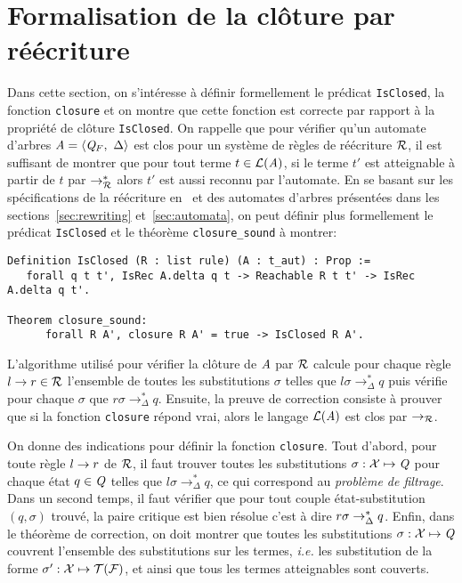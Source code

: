 
\section{Formalisation de la clôture par réécriture}
\label{sec:closure}

Dans cette section, on s'intéresse à définir formellement le prédicat \lstinline!IsClosed!, la fonction 
\lstinline!closure! et on montre que cette fonction est correcte par rapport à la propriété de clôture
\lstinline!IsClosed!. On rappelle que pour vérifier qu'un automate d'arbres $\mathit A = \langle \mathit Q_F,\ \Delta \rangle$ est
clos pour un système de règles de réécriture $\mathcal R$, il est suffisant de montrer que pour tout terme $t \in \mathcal{L}(\mathit A)$, si
le terme $t'$ est atteignable à partir de $t$ par $\rightarrow_\mathcal R^*$ alors $t'$ est aussi reconnu par l'automate. 
En se basant sur les spécifications de la réécriture en \coq\ et des automates d'arbres présentées dans les sections~\ref{sec:rewriting}
et~\ref{sec:automata}, on peut définir plus formellement le prédicat \lstinline!IsClosed! et le théorème \lstinline!closure_sound! à montrer:

\begin{lstlisting}
Definition IsClosed (R : list rule) (A : t_aut) : Prop :=
   forall q t t', IsRec A.delta q t -> Reachable R t t' -> IsRec A.delta q t'.

Theorem closure_sound:
      forall R A', closure R A' = true -> IsClosed R A'.
\end{lstlisting}


L'algorithme utilisé pour vérifier la clôture de  $\mathit A$ par $\mathcal R$ calcule pour chaque règle $l \rightarrow r \in \mathcal R$
l'ensemble de toutes les substitutions $\sigma$ telles que $l\sigma
\rightarrow_\Delta^* q$ puis vérifie pour chaque $\sigma$ que $r\sigma \rightarrow_\Delta^*q$.
Ensuite, la preuve de correction consiste à prouver que si la fonction \lstinline!closure!
répond vrai, alors le langage $\mathcal{L}(\mathit A)$ est clos par $\rightarrow_\mathcal R$.

On donne des indications pour définir la fonction \lstinline!closure!.  Tout d'abord, pour
toute règle $l \rightarrow r$ de $\mathcal R$, il faut trouver toutes les substitutions
$\sigma:\mathcal X \mapsto \mathit Q$ pour chaque état $q \in \mathit Q$ telles que
$l\sigma \rightarrow_\Delta^* q$, ce qui correspond au \emph{problème de filtrage}.
Dans un second temps, il faut vérifier que pour tout couple état-substitution $(q, \sigma)$ trouvé,
la paire critique est bien résolue c'est à dire $r\sigma \rightarrow_{\Delta}^* q$. 
Enfin, dans le théorème de correction, on doit montrer que toutes les substitutions $\sigma:
\mathcal X\mapsto \mathit Q$ couvrent l'ensemble des substitutions sur les termes, \textit{i.e.} les substitution de la forme $\sigma':
\mathcal X \mapsto \mathcal{T(F)}$, et ainsi que tous les termes atteignables sont couverts.

